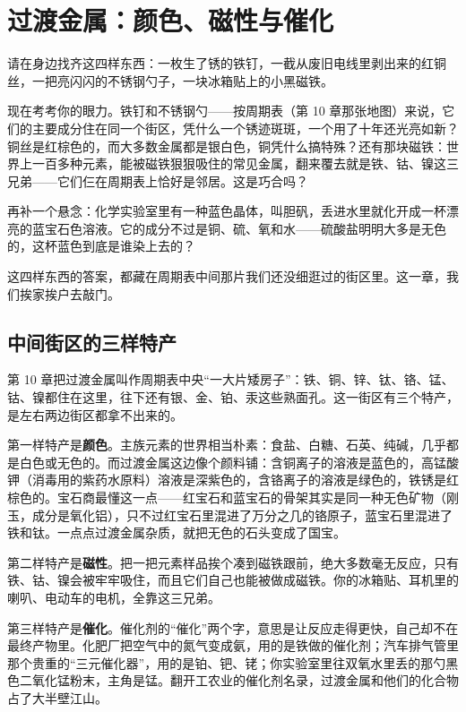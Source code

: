 \chapter{过渡金属：颜色、磁性与催化}

\begin{kaichang}
请在身边找齐这四样东西：一枚生了锈的铁钉，一截从废旧电线里剥出来的红铜丝，一把亮闪闪的不锈钢勺子，一块冰箱贴上的小黑磁铁。

现在考考你的眼力。铁钉和不锈钢勺——按周期表（第 10 章那张地图）来说，它们的主要成分住在同一个街区，凭什么一个锈迹斑斑，一个用了十年还光亮如新？铜丝是红棕色的，而大多数金属都是银白色，铜凭什么搞特殊？还有那块磁铁：世界上一百多种元素，能被磁铁狠狠吸住的常见金属，翻来覆去就是铁、钴、镍这三兄弟——它们仨在周期表上恰好是邻居。这是巧合吗？

再补一个悬念：化学实验室里有一种蓝色晶体，叫胆矾，丢进水里就化开成一杯漂亮的蓝宝石色溶液。它的成分不过是铜、硫、氧和水——硫酸盐明明大多是无色的，这杯蓝色到底是谁染上去的？

这四样东西的答案，都藏在周期表中间那片我们还没细逛过的街区里。这一章，我们挨家挨户去敲门。
\end{kaichang}

\section{中间街区的三样特产}

第 10 章把过渡金属叫作周期表中央“一大片矮房子”：铁、铜、锌、钛、铬、锰、钴、镍都住在这里，往下还有银、金、铂、汞这些熟面孔。这一街区有三个特产，是左右两边街区都拿不出来的。

第一样特产是\textbf{颜色}。主族元素的世界相当朴素：食盐、白糖、石英、纯碱，几乎都是白色或无色的。而过渡金属这边像个颜料铺：含铜离子的溶液是蓝色的，高锰酸钾（消毒用的紫药水原料）溶液是深紫色的，含铬离子的溶液是绿色的，铁锈是红棕色的。宝石商最懂这一点——红宝石和蓝宝石的骨架其实是同一种无色矿物（刚玉，成分是氧化铝），只不过红宝石里混进了万分之几的铬原子，蓝宝石里混进了铁和钛。一点点过渡金属杂质，就把无色的石头变成了国宝。

第二样特产是\textbf{磁性}。把一把元素样品挨个凑到磁铁跟前，绝大多数毫无反应，只有铁、钴、镍会被牢牢吸住，而且它们自己也能被做成磁铁。你的冰箱贴、耳机里的喇叭、电动车的电机，全靠这三兄弟。

第三样特产是\textbf{催化}。催化剂的“催化”两个字，意思是让反应走得更快，自己却不在最终产物里。化肥厂把空气中的氮气变成氨，用的是铁做的催化剂；汽车排气管里那个贵重的“三元催化器”，用的是铂、钯、铑；你实验室里往双氧水里丢的那勺黑色二氧化锰粉末，主角是锰。翻开工农业的催化剂名录，过渡金属和他们的化合物占了大半壁江山。

